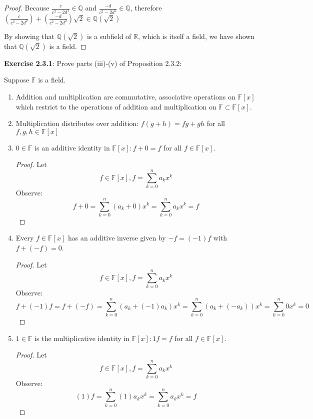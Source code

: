 \documentclass[a4paper]{article}
\begin{document}
\begin{myparindent}{0pt}
\begin{proof}
    Because $\frac{c}{c^2 - 2d^2} \in \mathbb{Q}$ and $\frac{-d}{c^2 - 2d^2} \in \mathbb{Q}$,
    therefore
    $(\frac{c}{c^2 - 2 d^2}) + (\frac{-d}{c^2 - 2d^2}) \sqrt{2} \in \mathbb{Q}(\sqrt{2})$ \newline

    By showing that $\mathbb{Q}(\sqrt{2})$ is a subfield of $\mathbb{R}$,
    which is itself a field, we have shown that $\mathbb{Q}(\sqrt{2})$ is a
    field.

\end{proof}

\textbf{Exercise 2.3.1}:
Prove parts (iii)-(v) of Proposition 2.3.2:

Suppose $\mathbb{F}$ is a field.

\begin{enumerate}[label=(\roman*)]
  \item Addition and multiplication are commutative, associative operations on
  $\mathbb{F}[x]$ which restrict to the operations of addition and multiplication
  on $\mathbb{F} \subset \mathbb{F}[x]$.

  \item Multiplication distributes over addition: $f(g + h) = fg + gh$ for all
  $f, g, h \in \mathbb{F}[x]$

  \item $0 \in \mathbb{F}$ is an additive identity in $\mathbb{F}[x]: f + 0 = f$
  for all $f \in \mathbb{F}[x]$.
    \begin{proof}
      Let
      \[
        f \in \mathbb{F}[x], f = \sum_{k=0}^{n} a_k x^k
      \]
      Observe:
      \[
        f + 0 = \sum_{k=0}^{n} (a_k + 0) x^k = \sum_{k=0}^{n} a_k x^k = f
      \]
    \end{proof}

  \item Every $f \in \mathbb{F}[x]$ has an additive inverse given by
  $-f = (-1)f$ with $f + (-f) = 0$.
    \begin{proof}
      Let
      \[
        f \in \mathbb{F}[x], f = \sum_{k=0}^{n} a_k x^k
      \]
      Observe:
      \[
        f + (-1)f = f + (-f) = \sum_{k=0}^{n} (a_k + (-1)a_k) x^k = \sum_{k=0}^{n} (a_k + (- a_k)) x^k = \sum_{k=0}^{n} 0 x^k = 0
      \]
    \end{proof}

  \item $1 \in \mathbb{F}$ is the multiplicative identity in
  $\mathbb{F}[x]: 1f = f$ for all $f \in \mathbb{F}[x]$.
    \begin{proof}
      Let
      \[
        f \in \mathbb{F}[x], f = \sum_{k=0}^{n} a_k x^k
      \]
      Observe:
      \[
        (1)f = \sum_{k=0}^{n} (1) a_k x^k = \sum_{k=0}^{n} a_k x^k = f
      \]
    \end{proof}
\end{enumerate}

\end{myparindent}
\end{document}
